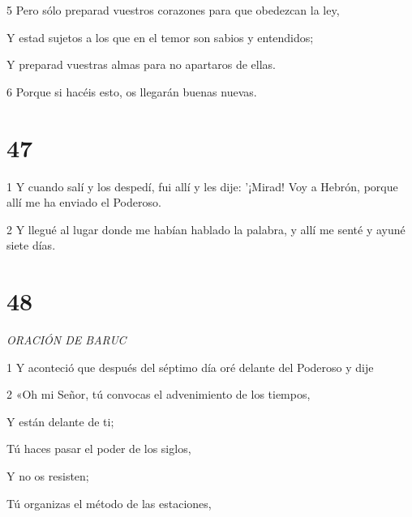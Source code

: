 \par 5 Pero sólo preparad vuestros corazones para que obedezcan la ley,

\par Y estad sujetos a los que en el temor son sabios y entendidos;

\par Y preparad vuestras almas para no apartaros de ellas.

\par 6 Porque si hacéis esto, os llegarán buenas nuevas.

\par [De lo que ya os hablé antes; ni caeréis en el tormento del que os he testificado antes.»

\par 7 Pero en cuanto a la palabra de que me iban a llevar, no se la comuniqué ni a ellos ni a mi hijo.]

\chapter{47}

\par 1 Y cuando salí y los despedí, fui allí y les dije: '¡Mirad! Voy a Hebrón, porque allí me ha enviado el Poderoso.

\par 2 Y llegué al lugar donde me habían hablado la palabra, y allí me senté y ayuné siete días.

\chapter{48}

\par \textit{ORACIÓN DE BARUC}

\par 1 Y aconteció que después del séptimo día oré delante del Poderoso y dije

\par 2 «Oh mi Señor, tú convocas el advenimiento de los tiempos,

\par Y están delante de ti;

\par Tú haces pasar el poder de los siglos,

\par Y no os resisten;

\par Tú organizas el método de las estaciones,

